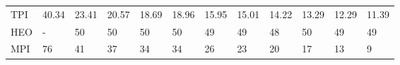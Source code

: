 \begin{table*}
{\begin{tabular}{llllllllllll}
TPI      &           40.34 &             23.41 &             20.57 &             18.69 &             18.96 &             15.95 &             15.01 &             14.22 &             13.29 &            12.29 &            11.39 \\
HEO      &               - &                50 &                50 &                50 &                50 &                49 &                49 &                48 &                50 &               49 &               49 \\
MPI      &              76 &                41 &                37 &                34 &                34 &                26 &                23 &                20 &                17 &               13 &                9 \\
\bottomrule
\end{tabular}}
\end{table*}
